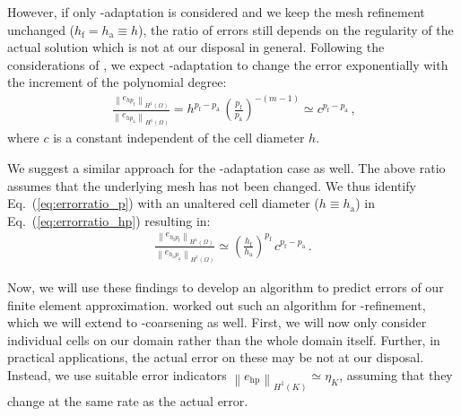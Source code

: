 However, if only \p-adaptation is considered and we keep the mesh refinement unchanged ($h_\text{f} = h_\text{a} \equiv h$), the ratio of errors still depends on the regularity of the actual solution which is not at our disposal in general. Following the considerations of \textcite{melenk2001}, we expect \p-adaptation to change the error exponentially with the increment of the polynomial degree:
\begin{align}
\label{eq:errorratio_p} \frac{\left\|e_{h p_\text{f}}\right\|_{H^{1}(\Omega)}}{\left\|e_{h p_\text{a}}\right\|_{H^{1}(\Omega)}} = h^{p_\text{f} - p_\text{a}} \, \left(\frac{p_\text{f}}{p_\text{a}}\right)^{-(m-1)} \simeq c^{p_\text{f} - p_\text{a}} \,\text{,}
\end{align}
where $c$ is a constant independent of the cell diameter $h$.

We suggest a similar approach for the \hp-adaptation case as well. The above ratio assumes that the underlying mesh has not been changed. We thus identify Eq.~(\ref{eq:errorratio_p}) with an unaltered cell diameter ($h \equiv h_\text{a}$) in Eq.~(\ref{eq:errorratio_hp}) resulting in:
\begin{align}
\label{eq:errorratio_hp_exp} \frac{\left\|e_{h_\text{f} p_\text{f}}\right\|_{H^{1}(\Omega)}}{\left\|e_{h_\text{a} p_\text{a}}\right\|_{H^{1}(\Omega)}} \simeq \left( \frac{h_\text{f}}{h_\text{a}} \right)^{p_\text{f}} \, c^{p_\text{f} - p_\text{a}} \,\text{.}
\end{align}

Now, we will use these findings to develop an algorithm to predict errors of our finite element approximation. \textcite{melenk2001} worked out such an algorithm for \hp-refinement, which we will extend to \hp-coarsening as well. First, we will now only consider individual cells on our domain rather than the whole domain itself. Further, in practical applications, the actual error on these may be not at our disposal. Instead, we use suitable error indicators $\left\|e_\text{hp}\right\|_{H^{1}(K)} \simeq \eta_K$, assuming that they change at the same rate as the actual error.


